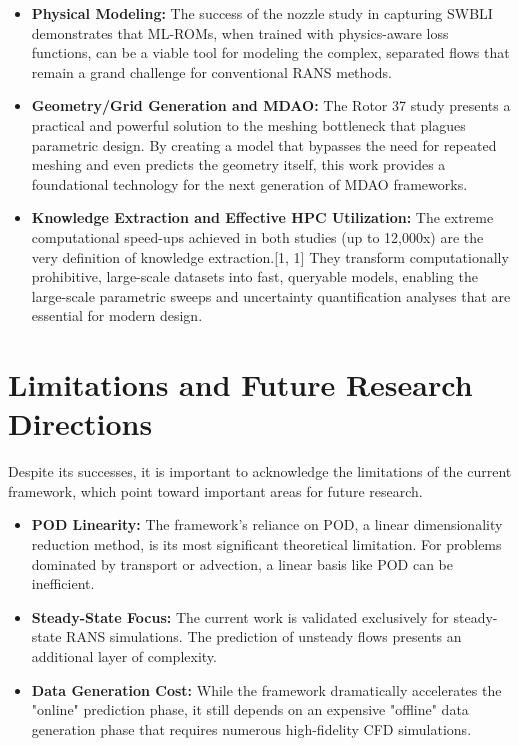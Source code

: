 \documentclass[12pt, a4paper]{report}
\begin{document}
\begin{itemize}
    \item \textbf{Physical Modeling:} The success of the nozzle study in capturing SWBLI demonstrates that ML-ROMs, when trained with physics-aware loss functions, can be a viable tool for modeling the complex, separated flows that remain a grand challenge for conventional RANS methods.
    \item \textbf{Geometry/Grid Generation and MDAO:} The Rotor 37 study presents a practical and powerful solution to the meshing bottleneck that plagues parametric design. By creating a model that bypasses the need for repeated meshing and even predicts the geometry itself, this work provides a foundational technology for the next generation of MDAO frameworks.
    \item \textbf{Knowledge Extraction and Effective HPC Utilization:} The extreme computational speed-ups achieved in both studies (up to 12,000x) are the very definition of knowledge extraction.[1, 1] They transform computationally prohibitive, large-scale datasets into fast, queryable models, enabling the large-scale parametric sweeps and uncertainty quantification analyses that are essential for modern design.
\end{itemize}

\section{Limitations and Future Research Directions}

Despite its successes, it is important to acknowledge the limitations of the current framework, which point toward important areas for future research.

\begin{itemize}
    \item \textbf{POD Linearity:} The framework's reliance on POD, a linear dimensionality reduction method, is its most significant theoretical limitation. For problems dominated by transport or advection, a linear basis like POD can be inefficient.
    \item \textbf{Steady-State Focus:} The current work is validated exclusively for steady-state RANS simulations. The prediction of unsteady flows presents an additional layer of complexity.
    \item \textbf{Data Generation Cost:} While the framework dramatically accelerates the "online" prediction phase, it still depends on an expensive "offline" data generation phase that requires numerous high-fidelity CFD simulations.
\end{itemize}
\end{document}
